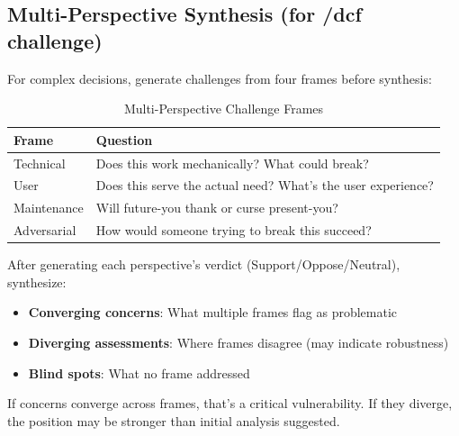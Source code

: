 \subsection{Multi-Perspective Synthesis (for /dcf challenge)}

For complex decisions, generate challenges from four frames before synthesis:

\begin{table}[H]
\centering
\begin{tabular}{lp{8cm}}
\toprule
\textbf{Frame} & \textbf{Question} \\
\midrule
Technical & Does this work mechanically? What could break? \\
User & Does this serve the actual need? What's the user experience? \\
Maintenance & Will future-you thank or curse present-you? \\
Adversarial & How would someone trying to break this succeed? \\
\bottomrule
\end{tabular}
\caption{Multi-Perspective Challenge Frames}
\end{table}

After generating each perspective's verdict (Support/Oppose/Neutral), synthesize:
\begin{itemize}
    \item \textbf{Converging concerns}: What multiple frames flag as problematic
    \item \textbf{Diverging assessments}: Where frames disagree (may indicate robustness)
    \item \textbf{Blind spots}: What no frame addressed
\end{itemize}

If concerns converge across frames, that's a critical vulnerability. If they diverge, the position may be stronger than initial analysis suggested.

